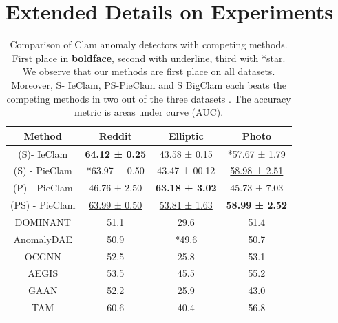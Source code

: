 \documentclass{article}
\theoremstyle{plain}
\theoremstyle{definition}
\theoremstyle{remark}
\begin{document}
\section{Extended Details on Experiments}
\label{Extended Details on Experiments}

\begin{table}[t]
\centering
\begin{tabular}{|c|c|c|c|}
    \hline
  Method  & Reddit& Elliptic& Photo\\
    \hline

(S)- IeClam& \textbf{64.12 ± 0.25}& 43.58 ± 0.15& *57.67 ± 1.79\\
(S) - PieClam & *63.97 ± 0.50 & 43.47 ± 00.12 & \underline{58.98 ± 2.51} \\
(P) - PieClam & 46.76 ± 2.50 & \textbf{63.18 ± 3.02} & 45.73 ± 7.03 \\
(PS) - PieClam & \underline{63.99 ± 0.50} & \underline{53.81 ± 1.63} & \textbf{58.99 ± 2.52} \\
 \hline
 DOMINANT  & 51.1& 29.6&51.4\\
 AnomalyDAE &50.9& *49.6&50.7\\
 OCGNN  &52.5 & 25.8&53.1\\
 AEGIS &53.5 & 45.5&55.2\\
 GAAN &52.2 &25.9 &43.0\\
 TAM &60.6 & 40.4 & 56.8\\
 \hline
\end{tabular}
\caption{Comparison of Clam anomaly detectors with competing methods. %
 First place in \textbf{boldface}, second with \underline{underline}, third with *star. We observe that our methods are first place on all datasets. Moreover, S- IeClam, PS-PieClam and S BigClam each beats the competing methods in two out of the three datasets . The accuracy metric is areas under curve (AUC).}
\label{Table2}
\end{table}
\end{document}
